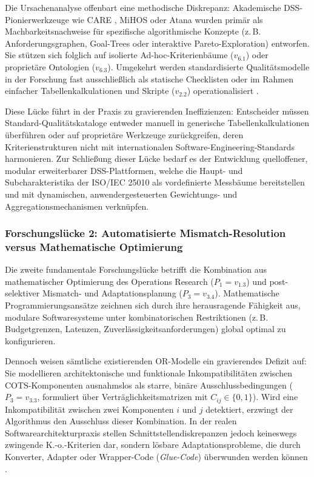 Die Ursachenanalyse offenbart eine methodische Diskrepanz: Akademische DSS-Pionier\-werkzeuge wie CARE \parencite{6RNULWVY}, MiHOS \parencite{9F79VAAB} oder Atana \parencite{MZ8JHDYA} wurden primär als Machbarkeitsnachweise für spezifische algorithmische Konzepte (z.\,B. Anforderungsgraphen, Goal-Trees oder interaktive Pareto-Exploration) entworfen. Sie stützen sich folglich auf isolierte Ad-hoc-Kriterienbäume ($v_{6.1}$) oder proprietäre Ontologien ($v_{6.3}$). Umgekehrt werden standardisierte Qualitätsmodelle in der Forschung fast ausschließlich als statische Checklisten oder im Rahmen einfacher Tabellenkalkulationen und Skripte ($v_{2.2}$) operationalisiert \parencite{M3B2D3GD, DAU8NSK8, LYMHTPXS}. 

Diese Lücke führt in der Praxis zu gravierenden Ineffizienzen: Entscheider müssen Standard-Qualitätskataloge entweder manuell in generische Tabellenkalkulationen überführen oder auf proprietäre Werkzeuge zurückgreifen, deren Kriterienstrukturen nicht mit internationalen Software-Engineering-Standards harmonieren. Zur Schließung dieser Lücke bedarf es der Entwicklung quelloffener, modular erweiterbarer DSS-Plattformen, welche die Haupt- und Subcharakteristika der ISO/IEC 25010 als vordefinierte Messbäume bereitstellen und mit dynamischen, anwendergesteuerten Gewichtungs- und Aggregationsmechanismen verknüpfen.

\subsubsection{Forschungslücke 2: Automatisierte Mismatch-Resolution versus Mathematische Optimierung}
\label{subsubsec:gap2}

Die zweite fundamentale Forschungslücke betrifft die Kombination aus mathematischer Optimierung des Operations Research ($P_1 = v_{1.3}$) und post-selektiver Mismatch- und Adaptationsplanung ($P_3 = v_{3.4}$). Mathematische Programmierungsansätze \parencite{ZQMG69VT, VUVLUN85, B7ZTQCZZ, JX4RDRDU, UFCEV52H, YVWGHAWQ} zeichnen sich durch ihre herausragende Fähigkeit aus, modulare Softwaresysteme unter kombinatorischen Restriktionen (z.\,B. Budgetgrenzen, Latenzen, Zuverlässigkeitsanforderungen) global optimal zu konfigurieren. 

Dennoch weisen sämtliche existierenden OR-Modelle ein gravierendes Defizit auf: Sie modellieren architektonische und funktionale Inkompatibilitäten zwischen COTS-Komponenten ausnahmslos als starre, binäre Ausschlussbedingungen ($P_3 = v_{3.3}$, formuliert über Verträglichkeitsmatrizen mit $C_{ij} \in \{0, 1\}$). Wird eine Inkompatibilität zwischen zwei Komponenten $i$ und $j$ detektiert, erzwingt der Algorithmus den Ausschluss dieser Kombination. In der realen Softwarearchitekturpraxis stellen Schnittstellendiskrepanzen jedoch keineswegs zwingende K.-o.-Kriterien dar, sondern lösbare Adaptationsprobleme, die durch Konverter, Adapter oder Wrapper-Code (\textit{Glue-Code}) überwunden werden können \parencite{9F79VAAB, WZM7DUBY}.

